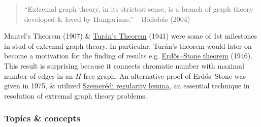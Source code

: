 \documentclass{article}
\begin{document}
\begin{quote}
	``Extremal graph theory, in its strictest sense, is a branch of graph theory developed \& loved by Hungarians.'' -- {\sc Bollob\'as} (2004)
\end{quote}
Mantel's Theorem (1907) \& \href{https://en.wikipedia.org/wiki/Tur%C3%A1n%27s_theorem}{Tur\'an's Theorem} (1941) were some of 1st milestones in stud of extremal graph theory. In particular, Tur\'an's theorem would later on become a motivation for the finding of results e.g. \href{https://en.wikipedia.org/wiki/Erd%C5%91s%E2%80%93Stone_theorem}{Erd\H{o}s--Stone theorem} (1946). This result is surprising because it connects chromatic number with maximal number of edges in an $H$-free graph. An alternative proof of Erd\H{o}s--Stone was given in 1975, \& utilized \href{https://en.wikipedia.org/wiki/Szemer%C3%A9di_regularity_lemma}{Szemer\'edi regularity lemma}, an essential technique in resolution of extremal graph theory problems.

\subsubsection{Topics \& concepts}
\end{document}
